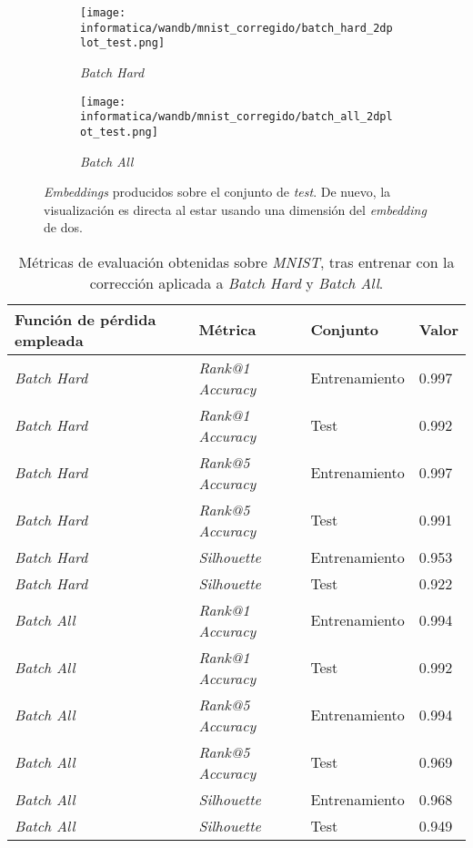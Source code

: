 \begin{figure}[!hbtp]
\centering
    \begin{subfigure}{.5\textwidth}
        \centering
        \texttt{[image: informatica/wandb/mnist\_corregido/batch\_hard\_2dplot\_test.png]}
        \caption{\textit{Batch Hard}}
    \end{subfigure}%
    \begin{subfigure}{.5\textwidth}
        \centering
        \texttt{[image: informatica/wandb/mnist\_corregido/batch\_all\_2dplot\_test.png]}
        \caption{\textit{Batch All}}
    \end{subfigure}
\caption{\textit{Embeddings} producidos sobre el conjunto de \textit{test}. De nuevo, la visualización es directa al estar usando una dimensión del \textit{embedding} de dos.}
\label{img:mnist_corregido_embeddings_aprendidos}
\end{figure}

\begin{table}[!hbtp]
    \centering
    \begin{tabular}{|l|l|l|l|}
        \hline
        Función de pérdida empleada & Métrica &  Conjunto & Valor \\
        \hline

        \textit{Batch Hard} & \textit{Rank@1 Accuracy} & Entrenamiento & 0.997 \\
        \textit{Batch Hard} & \textit{Rank@1 Accuracy} & Test & 0.992  \\
        \textit{Batch Hard} & \textit{Rank@5 Accuracy} & Entrenamiento & 0.997  \\
        \textit{Batch Hard} & \textit{Rank@5 Accuracy} & Test & 0.991 \\
        \textit{Batch Hard} & \textit{Silhouette} & Entrenamiento & 0.953 \\
        \textit{Batch Hard} & \textit{Silhouette} & Test & 0.922 \\
        \hline
        \textit{Batch All} & \textit{Rank@1 Accuracy} & Entrenamiento & 0.994 \\
        \textit{Batch All} & \textit{Rank@1 Accuracy} & Test & 0.992  \\
        \textit{Batch All} & \textit{Rank@5 Accuracy} & Entrenamiento & 0.994  \\
        \textit{Batch All} & \textit{Rank@5 Accuracy} & Test & 0.969 \\
        \textit{Batch All} & \textit{Silhouette} & Entrenamiento & 0.968 \\
        \textit{Batch All} & \textit{Silhouette} & Test & 0.949 \\


        \hline

    \end{tabular}
    \caption{Métricas de evaluación obtenidas sobre \textit{MNIST}, tras entrenar con la corrección aplicada a \textit{Batch Hard} y \textit{Batch All}.}
    \label{table:resultados_mnist_corregido}
\end{table}

